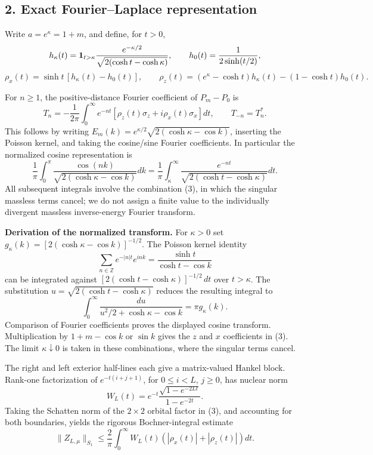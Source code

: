 \documentclass[
  10pt,
  a4paper,
]{article}
\begin{document}
\subsection{2. Exact Fourier--Laplace representation}\label{exact-fourierlaplace-representation}

Write \(a=e^\kappa=1+m\), and define, for \(t>0\), \[
 h_\kappa(t)={\bf1}_{t>\kappa}
 \frac{e^{-\kappa/2}}{\sqrt{2(\cosh t-\cosh\kappa)}},
 \qquad h_0(t)=\frac1{2\sinh(t/2)},
\] \[
 \rho_x(t)=\sinh t\,[h_\kappa(t)-h_0(t)],\qquad
 \rho_z(t)=(e^\kappa-\cosh t)h_\kappa(t)
                -(1-\cosh t)h_0(t).
\]

For \(n\ge1\), the positive-distance Fourier coefficient of \(P_m-P_0\) is \[
 T_n=-\frac1{2\pi}\int_0^\infty e^{-nt}
       [\rho_z(t)\sigma_z+i\rho_x(t)\sigma_x]dt,
 \qquad T_{-n}=T_n^*.
\tag{3}
\] This follows by writing \(E_m(k)=e^{\kappa/2}\sqrt{2(\cosh\kappa-\cos k)}\), inserting the Poisson kernel, and taking the cosine/sine Fourier coefficients. In particular the normalized cosine representation is \[
 \frac1\pi\int_0^\pi\frac{\cos(nk)}{\sqrt{2(\cosh\kappa-\cos k)}}dk
 =\frac1\pi\int_\kappa^\infty\frac{e^{-nt}}{\sqrt{2(\cosh t-\cosh\kappa)}}dt.
\] All subsequent integrals involve the combination (3), in which the singular massless terms cancel; we do not assign a finite value to the individually divergent massless inverse-energy Fourier transform.

\textbf{Derivation of the normalized transform.} For \(\kappa>0\) set \(g_\kappa(k)=[2(\cosh\kappa-\cos k)]^{-1/2}\). The Poisson kernel identity \[
\sum_{n\in\mathbb Z}e^{-|n|t}e^{ink}=\frac{\sinh t}{\cosh t-\cos k}
\] can be integrated against \([2(\cosh t-\cosh\kappa)]^{-1/2}\,dt\) over \(t>\kappa\). The substitution \(u=\sqrt{2(\cosh t-\cosh\kappa)}\) reduces the resulting integral to \[
 \int_0^\infty\frac{du}{u^2/2+\cosh\kappa-\cos k}=\pi g_\kappa(k).
\] Comparison of Fourier coefficients proves the displayed cosine transform. Multiplication by \(1+m-\cos k\) or \(\sin k\) gives the \(z\) and \(x\) coefficients in (3). The limit \(\kappa\downarrow0\) is taken in these combinations, where the singular terms cancel.

The right and left exterior half-lines each give a matrix-valued Hankel block. Rank-one factorization of \(e^{-t(i+j+1)}\), for \(0\le i<L\), \(j\ge0\), has nuclear norm \[
 W_L(t)=e^{-t}\frac{\sqrt{1-e^{-2Lt}}}{1-e^{-2t}}.
\tag{4}
\] Taking the Schatten norm of the \(2\times2\) orbital factor in (3), and accounting for both boundaries, yields the rigorous Bochner-integral estimate \[
 \|Z_{L,\mu}\|_{S_1}\le\frac2\pi\int_0^\infty
 W_L(t)(|\rho_x(t)|+|\rho_z(t)|)dt.
\tag{5}
\]
\end{document}
